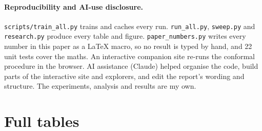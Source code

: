 \documentclass{article}
\begin{document}
\paragraph{Reproducibility and AI-use disclosure.} \texttt{scripts/train\_all.py} trains and caches every run.
\texttt{run\_all.py}, \texttt{sweep.py} and \texttt{research.py} produce every table and figure. \texttt{paper\_numbers.py} writes
every number in this paper as a LaTeX macro, so no result is typed by hand, and 22 unit tests cover the maths. An interactive
companion site re-runs the conformal procedure in the browser. AI assistance (Claude) helped organise the code, build parts of the interactive site and explorers, and edit the report's wording and structure. The experiments, analysis and results are my own.




\appendix
\section{Full tables}\label{app:tables}
\begin{table}[h]
\centering\scriptsize
\caption{All methods at $\alpha=0.1$: MNIST, CIFAR-10 and CIFAR-10 with the pretrained ResNet-18 (mean over seeds).}

\end{table}
\begin{table}[h]
\centering\scriptsize
\caption{All methods at $\alpha=0.1$: CIFAR-100 and ImageNet (size $\pm$ std over seeds).}

\end{table}
\end{document}
